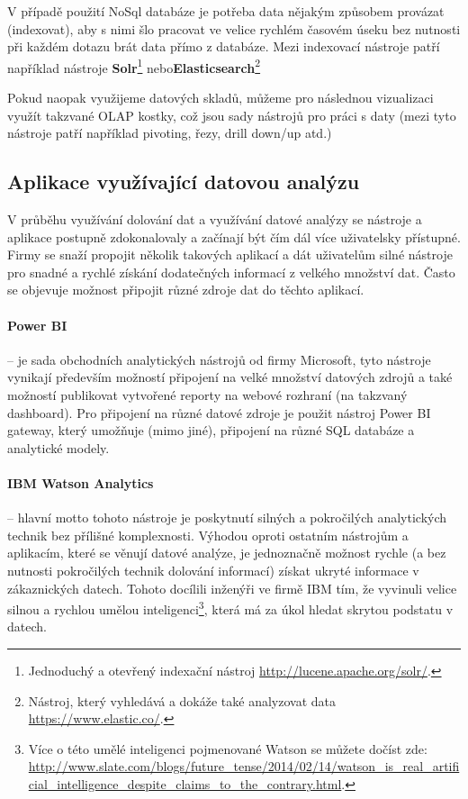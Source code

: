 \par V případě použití NoSql databáze je potřeba data nějakým způsobem provázat (indexovat), aby s nimi šlo pracovat ve velice rychlém časovém úseku bez nutnosti při každém dotazu brát data přímo z databáze. Mezi indexovací nástroje patří například nástroje \textbf{Solr}\footnote{Jednoduchý a otevřený indexační nástroj \url{http://lucene.apache.org/solr/}.} nebo\textbf{Elasticsearch}\footnote{Nástroj, který vyhledává a dokáže také analyzovat data \url{https://www.elastic.co/}.}

\par Pokud naopak využijeme datových skladů, můžeme pro následnou vizualizaci využít takzvané OLAP kostky, což jsou sady nástrojů pro práci s daty (mezi tyto nástroje patří například pivoting, řezy, drill down/up atd.)

\subsection{Aplikace využívající datovou analýzu}
\par V průběhu využívání dolování dat a využívání datové analýzy se nástroje a aplikace postupně zdokonalovaly a začínají být čím dál více uživatelsky přístupné. Firmy se snaží propojit několik takových aplikací a dát uživatelům silné nástroje pro snadné a rychlé získání dodatečných informací z velkého množství dat. Často se objevuje možnost připojit různé zdroje dat do těchto aplikací.

\paragraph{Power BI} -- je sada obchodních analytických nástrojů od firmy Microsoft, tyto nástroje vynikají především možností připojení na velké množství datových zdrojů a také možností publikovat vytvořené reporty na webové rozhraní (na takzvaný dashboard). Pro připojení na různé datové zdroje je použit nástroj Power BI gateway, který umožňuje (mimo jiné), připojení na různé SQL databáze a analytické modely. \cite{powerbi}

\paragraph{IBM Watson Analytics} -- hlavní motto tohoto nástroje je poskytnutí silných a pokročilých analytických technik bez přílišné komplexnosti. Výhodou oproti ostatním nástrojům a aplikacím, které se věnují datové analýze, je jednoznačně možnost rychle (a bez nutnosti pokročilých technik dolování informací) získat ukryté informace v zákaznických datech. Tohoto docílili inženýři ve firmě IBM tím, že vyvinuli velice silnou a rychlou umělou inteligenci\footnote{Více o této umělé inteligenci pojmenované Watson se můžete dočíst zde: \url{http://www.slate.com/blogs/future_tense/2014/02/14/watson_is_real_artificial_intelligence_despite_claims_to_the_contrary.html}.}, která má za úkol hledat skrytou podstatu v datech. \cite{watson}

